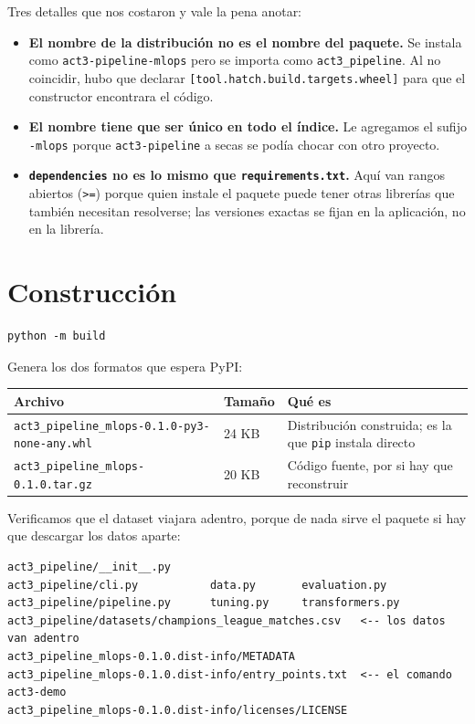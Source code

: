 \documentclass[12pt,a4paper]{article}
\begin{document}
Tres detalles que nos costaron y vale la pena anotar:

\begin{itemize}[leftmargin=1.2em]
\item \textbf{El nombre de la distribución no es el nombre del paquete.} Se instala como
\texttt{act3-pipeline-mlops} pero se importa como \texttt{act3\_pipeline}. Al no coincidir, hubo
que declarar \texttt{[tool.hatch.build.targets.wheel]} para que el constructor encontrara el
código.
\item \textbf{El nombre tiene que ser único en todo el índice.} Le agregamos el sufijo
\texttt{-mlops} porque \texttt{act3-pipeline} a secas se podía chocar con otro proyecto.
\item \textbf{\texttt{dependencies} no es lo mismo que \texttt{requirements.txt}.} Aquí van rangos
abiertos (\texttt{>=}) porque quien instale el paquete puede tener otras librerías que también
necesitan resolverse; las versiones exactas se fijan en la aplicación, no en la librería.
\end{itemize}

\section{Construcción}

\begin{verbatim}
python -m build
\end{verbatim}

Genera los dos formatos que espera PyPI:

\begin{center}
\begin{tabular}{|l|l|p{6.2cm}|}
\hline
\textbf{Archivo} & \textbf{Tamaño} & \textbf{Qué es} \\
\hline
\texttt{act3\_pipeline\_mlops-0.1.0-py3-none-any.whl} & 24 KB & Distribución construida; es la que
\texttt{pip} instala directo \\
\hline
\texttt{act3\_pipeline\_mlops-0.1.0.tar.gz} & 20 KB & Código fuente, por si hay que reconstruir \\
\hline
\end{tabular}
\end{center}

Verificamos que el dataset viajara adentro, porque de nada sirve el paquete si hay que descargar
los datos aparte:

\begin{verbatim}
act3_pipeline/__init__.py
act3_pipeline/cli.py           data.py       evaluation.py
act3_pipeline/pipeline.py      tuning.py     transformers.py
act3_pipeline/datasets/champions_league_matches.csv   <-- los datos van adentro
act3_pipeline_mlops-0.1.0.dist-info/METADATA
act3_pipeline_mlops-0.1.0.dist-info/entry_points.txt  <-- el comando act3-demo
act3_pipeline_mlops-0.1.0.dist-info/licenses/LICENSE
\end{verbatim}
\end{document}
